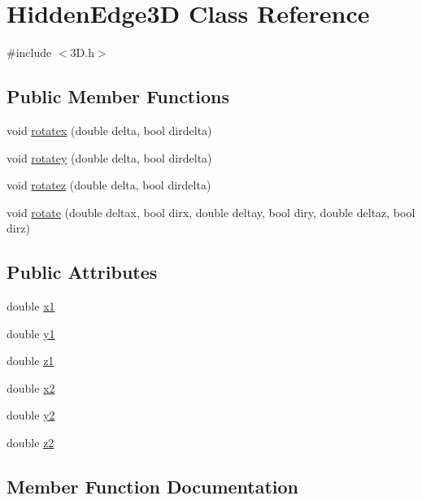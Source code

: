 \hypertarget{class_hidden_edge3_d}{}\section{Hidden\+Edge3D Class Reference}
\label{class_hidden_edge3_d}


{\ttfamily \#include $<$3\+D.\+h$>$}

\subsection*{Public Member Functions}
\begin{DoxyCompactItemize}
\item 
void \hyperlink{class_hidden_edge3_d_af52b93b4ec291277aaf5c1138068f6db}{rotatex} (double delta, bool dirdelta)
\item 
void \hyperlink{class_hidden_edge3_d_aacf1c6981dc9189b56de6f0920e146ce}{rotatey} (double delta, bool dirdelta)
\item 
void \hyperlink{class_hidden_edge3_d_acf087a769831355854758b043e9b4bfa}{rotatez} (double delta, bool dirdelta)
\item 
void \hyperlink{class_hidden_edge3_d_a47c13f15de3ae05d2ea539ed094084e9}{rotate} (double deltax, bool dirx, double deltay, bool diry, double deltaz, bool dirz)
\end{DoxyCompactItemize}
\subsection*{Public Attributes}
\begin{DoxyCompactItemize}
\item 
double \hyperlink{class_hidden_edge3_d_a2427c2c64f2923c487e4a05623ba58bb}{x1}
\item 
double \hyperlink{class_hidden_edge3_d_a40b67744e7d07d47204599c5481f5d2e}{y1}
\item 
double \hyperlink{class_hidden_edge3_d_ad8b9d5b2867873171153447a1f75204e}{z1}
\item 
double \hyperlink{class_hidden_edge3_d_adeba8473617de2da7c6276b8f7806fa0}{x2}
\item 
double \hyperlink{class_hidden_edge3_d_ab8a6f5b37b5b208042307a8a1060bd0d}{y2}
\item 
double \hyperlink{class_hidden_edge3_d_a6e4a7847916c1849577b18d5823c5e50}{z2}
\end{DoxyCompactItemize}


\subsection{Member Function Documentation}
